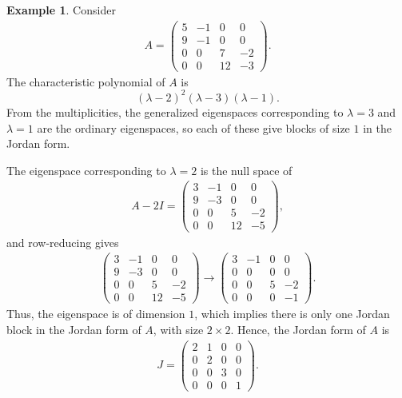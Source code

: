 \documentclass[11pt]{book}
\theoremstyle{definition}
\newtheorem{example}{Example}[chapter]
\numberwithin{equation}{chapter}
\begin{document}
\medskip

\begin{example}
Consider 
\begin{align*}
    A = \begin{pmatrix}
    5 & -1 & 0 & 0 \\
    9 & -1 & 0 & 0 \\
    0 & 0 & 7 & -2 \\
    0 & 0 & 12 & -3
    \end{pmatrix}.
\end{align*}
The characteristic polynomial of $A$ is 
$$(\lambda - 2)^2(\lambda - 3)(\lambda - 1).$$
From the multiplicities, the generalized eigenspaces corresponding to $\lambda = 3$ and $\lambda = 1$ are the ordinary eigenspaces, so each of these give blocks of size $1$ in the Jordan form.

The eigenspace corresponding to $\lambda = 2$ is the null space of 
\begin{align*}
    A - 2I = \begin{pmatrix}
    3 & -1 & 0 & 0 \\
    9 & -3 & 0 & 0 \\
    0 & 0 & 5 & -2 \\
    0 & 0 & 12 & -5
    \end{pmatrix},
\end{align*}
and row-reducing gives
\begin{align*}
    \begin{pmatrix}
    3 & -1 & 0 & 0 \\
    9 & -3 & 0 & 0 \\
    0 & 0 & 5 & -2 \\
    0 & 0 & 12 & -5
    \end{pmatrix} \to
    \begin{pmatrix}
    3 & -1 & 0 & 0 \\
    0 & 0 & 0 & 0 \\
    0 & 0 & 5 & -2 \\
    0 & 0 & 0 & -1
    \end{pmatrix}.
\end{align*}
Thus, the eigenspace is of dimension $1$, which implies there is only one Jordan block in the Jordan form of $A$, with size $2\times 2$. Hence, the Jordan form of $A$ is
\begin{align*}
    J = \begin{pmatrix}
    2 & 1 & 0 & 0 \\
    0 & 2 & 0 & 0 \\
    0 & 0 & 3 & 0 \\
    0 & 0 & 0 & 1
    \end{pmatrix}.
\end{align*}


\end{example}
\end{document}
